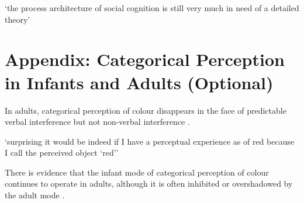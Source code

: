\documentclass[12pt]{extarticle}
\begin{document}
\begin{multicols}{3}
‘the process architecture of social cognition is still very much in need of a detailed theory’
\citep[p.\ 759]{adolphs_conceptual_2010}
\citep[p.\ 517]{Carey:1996hl}
 
 
 
\section{Appendix: Categorical Perception in Infants and Adults (Optional)}
 
In adults, categorical perception of colour disappears in the face of predictable verbal interference but not non-verbal interference
\citep{Roberson:2000ge,Pilling:2003bi,Wiggett:2008xt}.
 
‘surprising it would be indeed if I have a perceptual experience as of red because I call the perceived object ‘red’’
\citep[pp.\ 324--5]{Stokes:2006fd}
 
There is evidence that the infant mode of categorical perception of colour continues to operate in adults, although it is often inhibited or overshadowed by the adult mode \citep{Gilbert:2006yb}.
 

    
 
 
\footnotesize 


\end{multicols}
\end{document}
